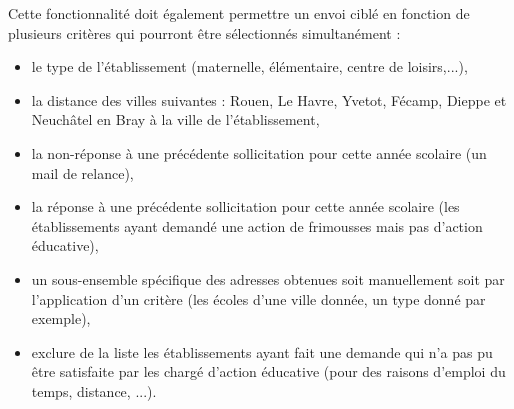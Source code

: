 Cette fonctionnalité doit également permettre un envoi ciblé en fonction de plusieurs critères qui pourront être sélectionnés simultanément :
\begin{itemize}
\item le type de l'établissement (maternelle, élémentaire, centre de loisirs,...), 
\item la distance des villes suivantes : Rouen, Le Havre, Yvetot, Fécamp, Dieppe et Neuchâtel en Bray à la ville de l'établissement,
\item la non-réponse à une précédente sollicitation pour cette année scolaire (un mail de relance),
\item la réponse à une précédente sollicitation pour cette année scolaire (les établissements ayant demandé une action de frimousses mais pas d'action éducative),
\item un sous-ensemble spécifique des adresses obtenues soit manuellement soit par l'application d'un critère (les écoles d'une ville donnée, un type donné par exemple),
\item exclure de la liste les établissements ayant fait une demande qui n'a pas pu être satisfaite par les chargé d'action éducative (pour des raisons d'emploi du temps, distance, ...). \\
\end{itemize}

